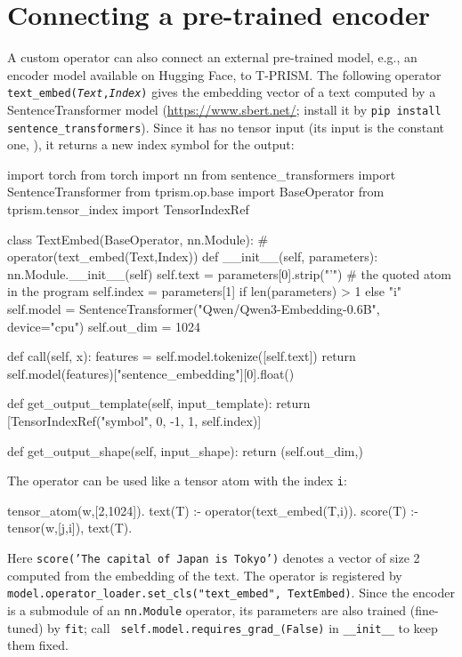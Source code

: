 \documentclass[a4paper]{report}
\begin{document}
\section{Connecting a pre-trained encoder}
\label{sec:tutorial_encoder}

A custom operator can also connect an external pre-trained model, e.g.,
an encoder model available on Hugging Face, to T-PRISM.  The following
operator {\tt text\_embed({\it Text},{\it Index})} gives the embedding
vector of a text computed by a SentenceTransformer model
(\url{https://www.sbert.net/}; install it by {\tt pip install
	sentence\_transformers}).  Since it has no tensor input (its input is the
constant one, ), it returns a new index symbol for
the output:
\begin{pythoncode}
import torch
from torch import nn
from sentence_transformers import SentenceTransformer
from tprism.op.base import BaseOperator
from tprism.tensor_index import TensorIndexRef

class TextEmbed(BaseOperator, nn.Module):      # operator(text_embed(Text,Index))
    def __init__(self, parameters):
        nn.Module.__init__(self)
        self.text = parameters[0].strip("'")   # the quoted atom in the program
        self.index = parameters[1] if len(parameters) > 1 else "i"
        self.model = SentenceTransformer("Qwen/Qwen3-Embedding-0.6B", device="cpu")
        self.out_dim = 1024

    def call(self, x):
        features = self.model.tokenize([self.text])
        return self.model(features)["sentence_embedding"][0].float()

    def get_output_template(self, input_template):
        return [TensorIndexRef("symbol", 0, -1, 1, self.index)]

    def get_output_shape(self, input_shape):
        return (self.out_dim,)
\end{pythoncode}
The operator can be used like a tensor atom with the index {\tt i}:
\begin{prologcode}
tensor_atom(w,[2,1024]).
text(T) :- operator(text_embed(T,i)).
score(T) :- tensor(w,[j,i]), text(T).
\end{prologcode}
Here {\tt score('The capital of Japan is Tokyo')} denotes a vector of size
2 computed from the embedding of the text.  The operator is registered by
{\tt model.operator\_loader.set\_cls("text\_embed", TextEmbed)}.  Since the
encoder is a submodule of an {\tt nn.Module} operator, its parameters are
also trained (fine-tuned) by {\tt fit}; call {\tt
	self.model.requires\_grad\_(False)} in {\tt \_\_init\_\_} to keep them fixed.
\end{document}
